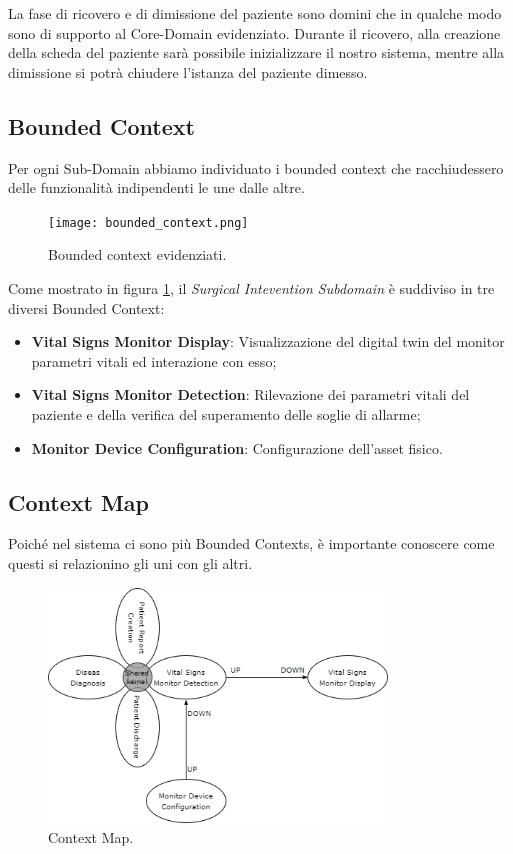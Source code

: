La fase di ricovero e di dimissione del paziente sono domini che in qualche modo sono di supporto al Core-Domain evidenziato.
\newline Durante il ricovero, alla creazione della scheda del paziente sarà possibile inizializzare il nostro sistema, mentre alla dimissione si potrà chiudere l'istanza del paziente dimesso.

\subsection{Bounded Context}

Per ogni Sub-Domain abbiamo individuato i bounded context che racchiudessero delle funzionalità indipendenti le une dalle altre.

\begin{figure}[H]
    \texttt{[image: bounded\_context.png]}
    \centering
    \caption{\label{pic:bounded-context}Bounded context evidenziati.}
\end{figure}

Come mostrato in figura     \ref{pic:bounded-context}, il \textit{Surgical Intevention Subdomain} è suddiviso in tre diversi Bounded Context:

\begin{itemize}
    \item \textbf{Vital Signs Monitor Display}: Visualizzazione del digital twin del monitor parametri vitali ed interazione con esso;
    \item \textbf{Vital Signs Monitor Detection}: Rilevazione dei parametri vitali del paziente e della verifica del superamento delle soglie di allarme;
    \item \textbf{Monitor Device Configuration}: Configurazione dell'asset fisico. 
\end{itemize}

\subsection{Context Map}
Poiché nel sistema ci sono più Bounded Contexts, è importante conoscere come questi si relazionino gli uni con gli altri.

\begin{figure}[H]
    \includegraphics[width=9cm]{Images/contextMap.png}
    \centering
    \caption{\label{pic:context-map}Context Map.}
\end{figure}

